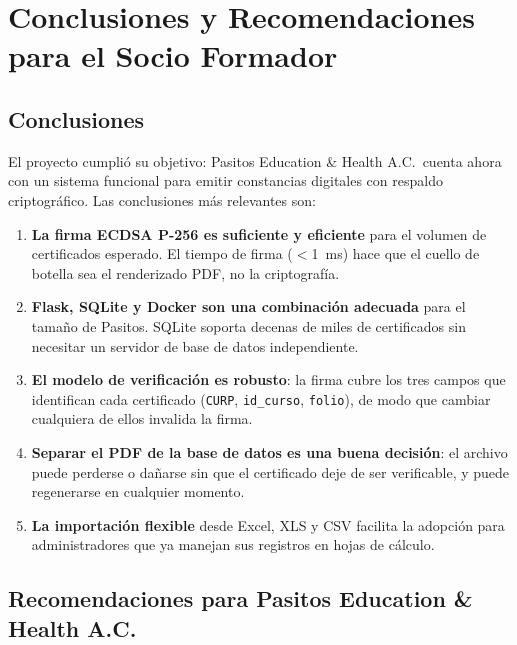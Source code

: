\documentclass[11pt,letterpaper]{article}
\begin{document}
\section{Conclusiones y Recomendaciones para el Socio Formador}

\subsection{Conclusiones}

El proyecto cumpli\'o su objetivo: Pasitos Education \& Health A.C.\ cuenta ahora
con un sistema funcional para emitir constancias digitales con respaldo
criptogr\'afico. Las conclusiones m\'as relevantes son:

\begin{enumerate}
  \item \textbf{La firma ECDSA P-256 es suficiente y eficiente} para el volumen
        de certificados esperado. El tiempo de firma ($<$1~ms) hace que el cuello
        de botella sea el renderizado PDF, no la criptograf\'ia.

  \item \textbf{Flask, SQLite y Docker son una combinaci\'on adecuada} para el
        tama\~no de Pasitos. SQLite soporta decenas de miles de certificados sin
        necesitar un servidor de base de datos independiente.

  \item \textbf{El modelo de verificaci\'on es robusto}: la firma cubre los tres
        campos que identifican cada certificado (\texttt{CURP}, \texttt{id\_curso},
        \texttt{folio}), de modo que cambiar cualquiera de ellos invalida la firma.

  \item \textbf{Separar el PDF de la base de datos es una buena decisi\'on}:
        el archivo puede perderse o da\~narse sin que el certificado deje de ser
        verificable, y puede regenerarse en cualquier momento.

  \item \textbf{La importaci\'on flexible} desde Excel, XLS y CSV facilita la
        adopci\'on para administradores que ya manejan sus registros en hojas de
        c\'alculo.
\end{enumerate}

\subsection{Recomendaciones para Pasitos Education \& Health A.C.}
\end{document}
